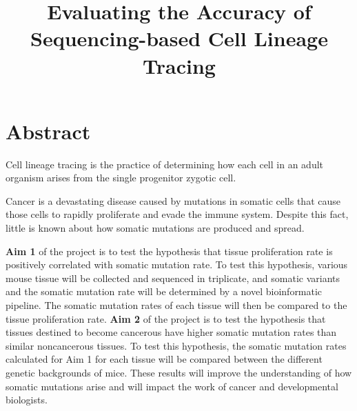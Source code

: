 \documentclass[12pt]{article}
\title{Evaluating the Accuracy of Sequencing-based Cell Lineage Tracing}
\date{}
\begin{document}
\maketitle





\section{Abstract}

Cell lineage tracing is the practice of determining how each cell in an adult organism arises from the single progenitor zygotic cell.

Cancer is a devastating disease caused by mutations in somatic cells that cause those cells to rapidly proliferate and evade the immune system.
Despite this fact, little is known about how somatic mutations are produced and spread.

\textbf{Aim 1} of the project is to test the hypothesis that tissue proliferation rate is positively correlated with somatic mutation rate.
To test this hypothesis, various mouse tissue will be collected and sequenced in triplicate, and somatic variants and the somatic mutation rate will be determined by a novel bioinformatic pipeline.
The somatic mutation rates of each tissue will then be compared to the tissue proliferation rate.
\textbf{Aim 2} of the project is to test the hypothesis that tissues destined to become cancerous have higher somatic mutation rates than similar noncancerous tissues.
To test this hypothesis, the somatic mutation rates calculated for Aim 1 for each tissue will be compared between the different genetic backgrounds of mice.
These results will improve the understanding of how somatic mutations arise and will impact the work of cancer and developmental biologists.
\end{document}
